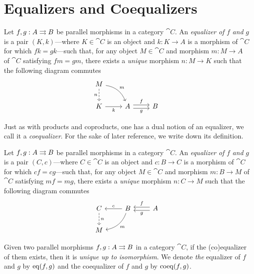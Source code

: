 \section{Equalizers and Coequalizers}

\begin{definition}[Equalizer]
\label{def:equalizer}
Let \(f, g: A \rightrightarrows B\) be parallel morphisms in a category \(\cat C\). An
\emph{equalizer of \(f\) and \(g\)} is a pair \((K, k)\)---where
\(K \in \cat C\) is an object and \(k: K \to A\) is a morphism of \(\cat C\) for
which \(f k = g k\)---such that, for any object \(M \in \cat C\) and morphism
\(m: M \to A\) of \(\cat C\) satisfying \(f m = g m\), there exists a
\emph{unique} morphism \(n: M \to K\) such that the following diagram commutes
\[
\begin{tikzcd}
M \ar[d, dashed, "n"'] \ar[rd, bend left, "m"] & &
\\
K \ar[r, "k"'] &A \ar[r, shift left, "f"] \ar[r, shift right, "g"'] &B
\end{tikzcd}
\]
\end{definition}

Just as with products and coproducts, one has a dual notion of an equalizer, we
call it a \emph{coequalizer}. For the sake of later reference, we write down its
definition.

\begin{definition}[Coequalizer]
\label{def:coequalizer}
Let \(f, g: A \rightrightarrows B\) be parallel morphisms in a category \(\cat C\). An
\emph{equalizer of \(f\) and \(g\)} is a pair \((C, c)\)---where
\(C \in \cat C\) is an object and \(c: B \to C\) is a morphism of \(\cat C\) for
which \(c f = c g\)---such that, for any object \(M \in \cat C\) and morphism
\(m: B \to M\) of \(\cat C\) satisfying \(m f = m g\), there exists a
\emph{unique} morphism \(n: C \to M\) such that the following diagram commutes
\[
\begin{tikzcd}
C \ar[d, dashed, "n"]
& B \ar[l, "c"'] \ar[ld, "m", bend left]
& A \ar[l, shift left, "g"] \ar[l, shift right, "f"']
\\
M& &
\end{tikzcd}
\]

\end{definition}

\begin{proposition}[Uniqueness]
\label{prop:(co)equalizer-unique-up-to-iso}
Given two parallel morphisms \(f, g: A \rightrightarrows B\) in a category \(\cat C\), if
the (co)equalizer of them exists, then it is \emph{unique up to isomorphism}. We
denote \emph{the} equalizer of \(f\) and \(g\) by \(\operatorname{eq}(f, g)\) and the
coequalizer of \(f\) and \(g\) by \(\operatorname{coeq}(f, g)\).
\end{proposition}

